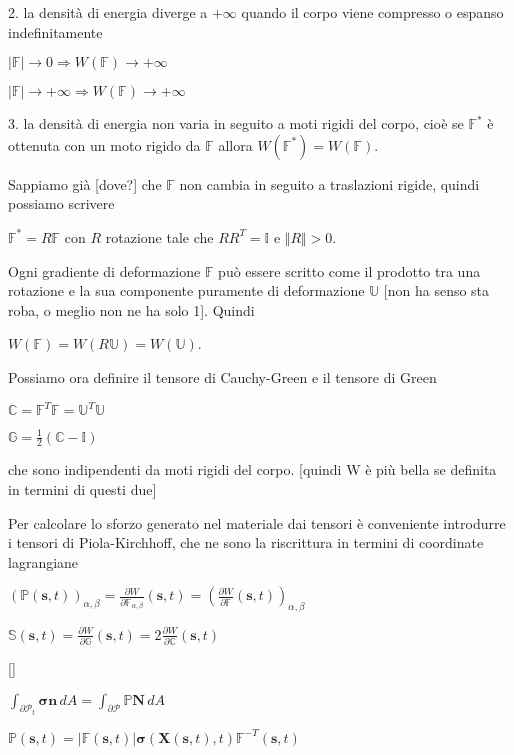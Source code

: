 2. la densità di energia diverge a $+\infty$ quando il corpo viene compresso o espanso indefinitamente  

$\vert \mathbb{F} \vert \rightarrow 0 \Rightarrow W(\mathbb{F}) \rightarrow +\infty$

$\vert \mathbb{F} \vert \rightarrow +\infty \Rightarrow W(\mathbb{F}) \rightarrow +\infty$

3.  la densità di energia non varia in seguito a moti rigidi del corpo, cioè se $\mathbb{F}^*$ è ottenuta con un moto rigido da $\mathbb{F}$ allora $W(\mathbb{F}^*) = W(\mathbb{F})$.

Sappiamo già [dove?] che $\mathbb{F}$ non cambia in seguito a traslazioni rigide, quindi possiamo scrivere

$\mathbb{F}^* = R\mathbb{F}$ con $R$ rotazione tale che $RR^T = \mathbb{I}$ e $\Vert R \Vert > 0$.

Ogni gradiente di deformazione $\mathbb{F}$ può essere scritto come il prodotto tra una rotazione e la sua componente puramente di deformazione $\mathbb{U}$ [non ha senso sta roba, o meglio non ne ha solo 1]. Quindi

$W(\mathbb{F}) = W(R\mathbb{U}) = W(\mathbb{U})$.

Possiamo ora definire il tensore di Cauchy-Green e il tensore di Green

$\mathbb{C} = \mathbb{F}^T\mathbb{F} = \mathbb{U}^T\mathbb{U}$

$\mathbb{G} = \frac{1}{2}(\mathbb{C}-\mathbb{I})$

che sono indipendenti da moti rigidi del corpo. [quindi W è più bella se definita in termini di questi due]

Per calcolare lo sforzo generato nel materiale dai tensori è conveniente introdurre i tensori di Piola-Kirchhoff, che ne sono la riscrittura in termini di coordinate lagrangiane

$(\mathbb{P}(\mathbf{s},t))_{\alpha,\beta} = \frac{\partial W}{\partial \mathbb{F}_{\alpha,\beta}} (\mathbf{s},t) =( \frac{\partial W}{\partial \mathbb{F}} (\mathbf{s},t))_{\alpha,\beta}$

$\mathbb{S}(\mathbf{s},t)=\frac{\partial W}{\partial\mathbb{G}}(\mathbf{s},t)=2\frac{\partial W}{\partial\mathbb{C}}(\mathbf{s},t)$

[]

$\int_{\partial\mathcal{P}_t} \mathbf{\sigma}\mathbf{n} \, dA = \int_{\partial\mathcal{P}} \mathbb{P}\mathbf{N} \, dA$

$\mathbb{P}(\mathbf{s},t) = \vert \mathbb{F}(\mathbf{s},t) \vert \mathbf{\sigma}(\mathbf{X}(\mathbf{s},t),t) \mathbb{F}^{-T}(\mathbf{s},t)$


